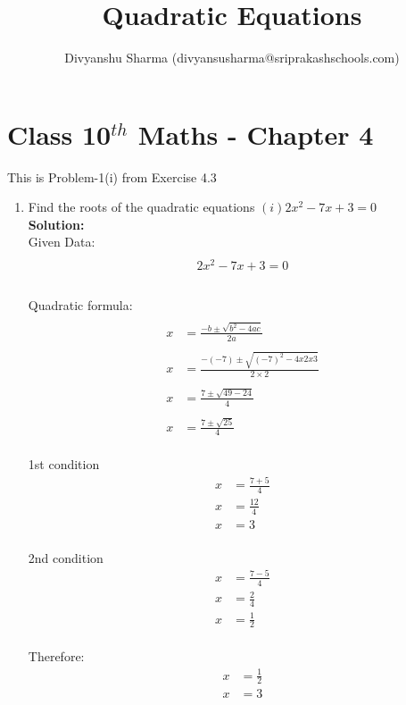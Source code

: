 \documentclass[12pt]{article}
\title{Quadratic Equations}
\author{Divyanshu Sharma (divyansusharma@sriprakashschools.com)}
\newcommand{\solution}{\noindent \textbf{Solution: }}
\begin{document}
\maketitle
\section*{Class 10$^{th}$ Maths - Chapter 4}
This is Problem-1(i) from Exercise 4.3
\begin{enumerate}
\item   Find the roots of the quadratic equations  
$(i)2{x^2} - 7x + 3 = 0$\\
\solution \\
Given Data:
\begin{align*}
\\{2x^2- 7x + 3 = 0}\\
\end{align*}
\\ Quadratic formula:
\begin{align}
\\x&=\frac{-b\pm\sqrt{b^2-4ac}}{2a}\\
\\x&=\frac{-(-7)\pm\sqrt{(-7)^2-4x2x3 }}{2 \times 2}\\
\\x&=\frac{7\pm\sqrt{49 - 24}}{4}\\
\\x&=\frac{7\pm\sqrt{25}}{4}\\
\end{align}

1st condition
\begin{align*}
x&=\frac{7+5}{4}\\
x&=\frac{12}{4}\\
x&=3\\
\end{align*}

2nd condition
\begin{align}
x&=\frac{7-5}{4}\\
x&=\frac{2}{4}\\
x&=\frac{1}{2}\\
\end{align}

Therefore:
\begin{align*}
    x&=\frac{1}{2}\\
    x&= 3
\end{align*}

\end{enumerate}
\end{document}
